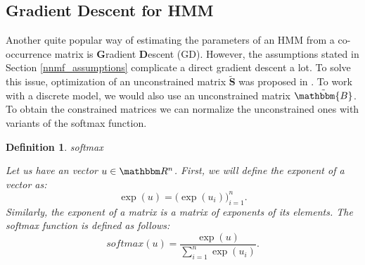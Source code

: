 \documentclass[shortabstract]{iithesis}
\newtheorem{definition}{Definition}
\begin{document}

    


\subsection{Gradient Descent for HMM}

Another quite popular way of estimating the parameters of an HMM from a co-occurrence matrix is \textbf{G}radient \textbf{D}escent (GD). However, the assumptions stated in Section \ref{nnmf_assumptions} complicate a direct gradient descent a lot. To solve this issue, optimization of an unconstrained matrix $\tilde{\textbf{S}}$ was proposed in \cite{lorek2022flowhmm}. To work with a discrete model, we would also use an unconstrained matrix $\tilde{\mathbbm{B}}$. To obtain the constrained matrices we can normalize the unconstrained ones with variants of the softmax function.

\begin{definition} {softmax}

    Let us have an vector $u \in \mathbbm R^n$. 
    First, we will define the exponent of a vector as:
    $$\exp(u) = \big(\exp(u_i) \big)_{i=1}^n\text{.}$$
    Similarly, the exponent of a matrix is a matrix of exponents of its elements.
    The softmax function is defined as follows:
     $$softmax(u) = \frac{\exp(u)}{\sum_{i=1}^n \exp(u_i)}\text{.}$$
\end{definition}
\end{document}
